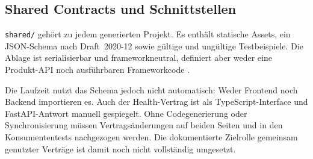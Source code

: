 \subsection{Shared Contracts und Schnittstellen}
\label{subsec:shared-contracts-schnittstellen}

\texttt{shared/} gehört zu jedem generierten Projekt. Es enthält statische
Assets, ein JSON-Schema nach Draft~2020-12 sowie gültige und ungültige
Testbeispiele. Die Ablage ist serialisierbar und frameworkneutral, definiert
aber weder eine Produkt-API noch ausführbaren Frameworkcode
\parencite{kleiveist2026architecture,kleiveist2026template}.

Die Laufzeit nutzt das Schema jedoch nicht automatisch: Weder Frontend noch
Backend importieren es. Auch der Health-Vertrag ist als TypeScript-Interface
und FastAPI-Antwort manuell gespiegelt. Ohne Codegenerierung oder
Synchronisierung müssen Vertragsänderungen auf beiden Seiten und in den
Konsumententests nachgezogen werden. Die dokumentierte Zielrolle gemeinsam
genutzter Verträge ist damit noch nicht vollständig umgesetzt.
